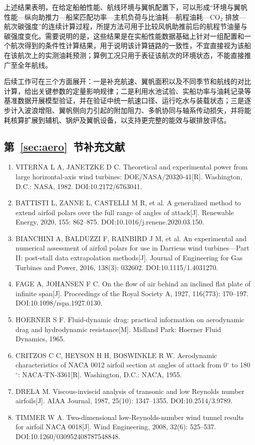 \documentclass[UTF8,a4paper,twoside,zihao=5,fontset=windows]{ctexart}
\renewcommand{\baselinestretch}{1.35}
\newcommand{\bibfont}{\songti\fontsize{9pt}{16pt}\selectfont}
\begin{document}
上述结果表明，在给定船舶性能、航线环境与翼帆配置下，可以形成“环境与翼帆性能—纵向助推力—船桨匹配功率—主机负荷与比油耗—航程油耗—CO$_2$ 排放—航次碳强度”的连续计算过程，所提方法可用于比较风帆助推前后的航程节油量与碳强度变化。需要说明的是，这些结果是在实船性能数据基础上针对一组配置和一个航次得到的条件性计算结果，用于说明该计算链路的一致性，不宜直接视为该船在该航次上的实测油耗预测；算例工况只用于表征该航次的环境状态，不能直接推广至全年航线。

后续工作可在三个方面展开：一是补充航速、翼帆面积以及不同季节和航线的对比计算，给出关键参数的定量影响规律；二是利用水池试验、实船功率与油耗记录等基准数据开展模型验证，并在验证中统一航速口径、运行吃水与装载状态；三是逐步计入波浪增阻、翼帆侧向力引起的附加阻力、多帆协同与轴系传动损失，并将能耗核算扩展到辅机、锅炉及翼帆设备，以支持更完整的能效与碳排放评估。

\subsection*{第~\ref{sec:aero}~节补充文献}
\begingroup
\renewcommand{\baselinestretch}{1}\bibfont
\setlength{\parindent}{0pt}
\begin{enumerate}\setlength{\itemsep}{0pt}\setlength{\parsep}{0pt}
\item VITERNA L A, JANETZKE D C. Theoretical and experimental power from large horizontal-axis wind turbines: DOE/NASA/20320-41[R]. Washington, D.C.: NASA, 1982. DOI:10.2172/6763041.
\item BATTISTI L, ZANNE L, CASTELLI M R, et al. A generalized method to extend airfoil polars over the full range of angles of attack[J]. Renewable Energy, 2020, 155: 862--875. DOI:10.1016/j.renene.2020.03.150.
\item BIANCHINI A, BALDUZZI F, RAINBIRD J M, et al. An experimental and numerical assessment of airfoil polars for use in Darrieus wind turbines---Part II: post-stall data extrapolation methods[J]. Journal of Engineering for Gas Turbines and Power, 2016, 138(3): 032602. DOI:10.1115/1.4031270.
\item FAGE A, JOHANSEN F C. On the flow of air behind an inclined flat plate of infinite span[J]. Proceedings of the Royal Society A, 1927, 116(773): 170--197. DOI:10.1098/rspa.1927.0130.
\item HOERNER S F. Fluid-dynamic drag: practical information on aerodynamic drag and hydrodynamic resistance[M]. Midland Park: Hoerner Fluid Dynamics, 1965.
\item CRITZOS C C, HEYSON H H, BOSWINKLE R W. Aerodynamic characteristics of NACA 0012 airfoil section at angles of attack from 0$^{\circ}$ to 180$^{\circ}$: NACA-TN-3361[R]. Washington, D.C.: NACA, 1955.
\item DRELA M. Viscous-inviscid analysis of transonic and low Reynolds number airfoils[J]. AIAA Journal, 1987, 25(10): 1347--1355. DOI:10.2514/3.9789.
\item TIMMER W A. Two-dimensional low-Reynolds-number wind tunnel results for airfoil NACA 0018[J]. Wind Engineering, 2008, 32(6): 525--537. DOI:10.1260/030952408787548848.
\end{enumerate}
\endgroup
\end{document}
